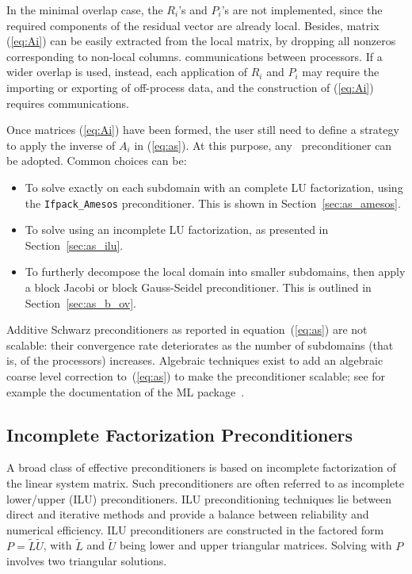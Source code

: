 In the minimal overlap case, the $R_i$'s and $P_i$'s are not implemented, since the
required components of the residual vector are already local. Besides, matrix
(\ref{eq:Ai}) can be easily extracted from the local matrix, by dropping all
nonzeros corresponding to non-local columns.
communications between processors. If a wider overlap
is used, instead, each application of $R_i$ and $P_i$ may require the
importing or exporting of
off-process data, and the construction of (\ref{eq:Ai}) requires
communications.

\smallskip

Once matrices (\ref{eq:Ai}) have been formed, the user still need to define a
strategy to apply the inverse of $A_i$ in (\ref{eq:as}). At this purpose,
any \ifpack\ preconditioner can be adopted. Common choices can be:
\begin{itemize}
\item To solve exactly on each subdomain with an complete LU factorization, using the \verb!Ifpack_Amesos!
preconditioner. This is shown in Section~\ref{sec:as_amesos}.
\item To solve using an incomplete LU factorization, as presented in
Section~\ref{sec:as_ilu}.
\item To furtherly decompose the local domain into smaller subdomains,
  then apply a block Jacobi or block Gauss-Seidel preconditioner. This is
  outlined in Section~\ref{sec:as_b_ov}.
\end{itemize}

\begin{remark}
Additive Schwarz preconditioners as reported in equation~(\ref{eq:as}) 
are not scalable: their convergence rate
deteriorates as the number of subdomains (that is, of the processors)
increases. Algebraic techniques
exist to add an algebraic coarse level correction to~(\ref{eq:as}) to make the
preconditioner scalable; 
see for example the documentation of the ML
package~\cite{ml-guide}.
\end{remark}

\subsection{Incomplete Factorization Preconditioners}
\label{sec:ilu}

A broad class of effective preconditioners is based on incomplete
factorization of the linear system matrix.  Such preconditioners are often
referred to as incomplete lower/upper (ILU) preconditioners.  
ILU preconditioning techniques lie between direct and
iterative methods and provide a balance between reliability and
numerical efficiency.  ILU preconditioners are constructed in the factored form
$P=\tilde{L} \tilde{U}$, with $\tilde{L}$ and $\tilde{U}$ being lower
and upper triangular matrices. Solving with $P$ involves two triangular
solutions.

